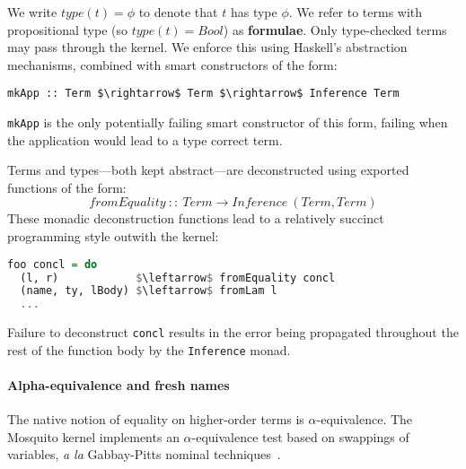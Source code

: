 \documentclass{llncs}
\newcommand{\deffont}[1]{\textbf{#1}}
\begin{document}
We write $type(t) = \phi$ to denote that $t$ has type $\phi$.
We refer to terms with propositional type (so $type(t) = Bool$) as \deffont{formulae}.
Only type-checked terms may pass through the kernel.
We enforce this using Haskell's abstraction mechanisms, combined with smart constructors of the form:
\begin{lstlisting}
mkApp :: Term $\rightarrow$ Term $\rightarrow$ Inference Term
\end{lstlisting}
\texttt{mkApp} is the only potentially failing smart constructor of this form, failing when the application would lead to a type correct term.

Terms and types---both kept abstract---are deconstructed using exported functions of the form:
\begin{displaymath}
fromEquality\ ::\ Term \rightarrow Inference\ (Term, Term)
\end{displaymath}
These monadic deconstruction functions lead to a relatively succinct programming style outwith the kernel:
\begin{lstlisting}[language=haskell]
foo concl = do
  (l, r)            $\leftarrow$ fromEquality concl
  (name, ty, lBody) $\leftarrow$ fromLam l
  ...
\end{lstlisting}
Failure to deconstruct \texttt{concl} results in the error being propagated throughout the rest of the function body by the \texttt{Inference} monad.

\paragraph{Alpha-equivalence and fresh names}
The native notion of equality on higher-order terms is $\alpha$-equivalence.
The Mosquito kernel implements an $\alpha$-equivalence test based on swappings of variables, \emph{a la} Gabbay-Pitts nominal techniques~\cite{gabbay:new:1999}.
\end{document}
